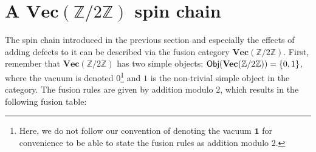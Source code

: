 \section{A $\mathbf{Vec}(\mathbb{Z}/2\mathbb{Z})$ spin chain}

The spin chain introduced in the previous section and especially the effects of adding defects to it can be described via the fusion category $\mathbf{Vec}(\mathbb{Z}/2\mathbb{Z})$. First, remember that $\mathbf{Vec}(\mathbb{Z}/2\mathbb{Z})$ has two simple objects: $\mathsf{Obj}(\mathbf{Vec}(\mathbb{Z}/2\mathbb{Z}))=\{0,1\}$, where the vacuum is denoted $0$\footnote{Here, we do not follow our convention of denoting the vacuum $\mathbf{1}$ for convenience to be able to state the fusion rules as addition modulo $2$.} and $1$ is the non-trivial simple object in the category. The fusion rules are given by addition modulo 2, which results in the following fusion table:
